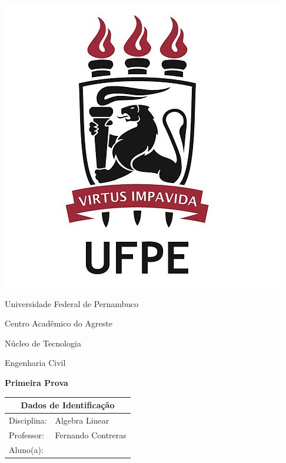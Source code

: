 \documentclass[oneside,a4paper,11pt]{article}
\newcommand{\universidade}{Universidade Federal de Pernambuco}
\newcommand{\centro}{Centro Acadêmico do Agreste}
\newcommand{\departamento}{Núcleo de Tecnologia}
\newcommand{\curso}{Engenharia Civil}
\newcommand{\professor}{Fernando Contreras}
\newcommand{\disciplina}{Algebra Linear}
\begin{document}
	\pagestyle{empty}
	
	\begin{center}
	\includegraphics[width=\linewidth/6]{logoUFPE.jpg}%
	 	\vspace{0pt}
	 	
		\universidade
		\par
		\centro
		\par
		\departamento
		\par
		\curso
		\par
		\vspace{01pt}
		\large \textbf{Primeira Prova}
		
	\end{center}
	
	\vspace{0pt}
	
	\begin{tabular}{ |l|p{12cm}| }
		
		\hline
		\multicolumn{2}{|c|}{\textbf{Dados de Identificação}} \\
			\hline
		Disciplina:        &    \disciplina          \\
		\hline
		Professor:         &    \professor           \\
	\hline
	Aluno(a):         &\\
	
		\hline
	\end{tabular}
	
\end{document}

